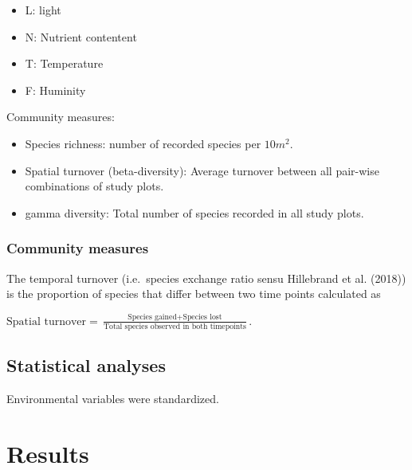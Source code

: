 \documentclass[fleqn,10pt,lineno]{wlpeerj} %
\providecommand{\tightlist}{
\setlength{\itemsep}{0pt}\setlength{\parskip}{0pt}}
\theoremstyle{definition}
\theoremstyle{definition}
\theoremstyle{definition}
\theoremstyle{remark}
\begin{document}
\begin{itemize}
\tightlist
\item
  L: light
\item
  N: Nutrient contentent
\item
  T: Temperature
\item
  F: Huminity
\end{itemize}

Community measures:

\begin{itemize}
\tightlist
\item
  Species richness: number of recorded species per \(10m^2\).
\item
  Spatial turnover (beta-diversity): Average turnover between all
  pair-wise combinations of study plots.
\item
  gamma diversity: Total number of species recorded in all study plots.
\end{itemize}

\subsubsection*{Community measures}\label{community-measures}

The temporal turnover (i.e.~species exchange ratio sensu Hillebrand et
al. (2018)) is the proportion of species that differ between two time
points calculated as

\(\text{Spatial turnover} = \frac{\text{Species gained} + \text{Species lost}}{\text{Total species observed in both timepoints}}\).

\subsection*{Statistical analyses}\label{statistical-analyses}

Environmental variables were standardized.

\section*{Results}\label{results}
\end{document}
